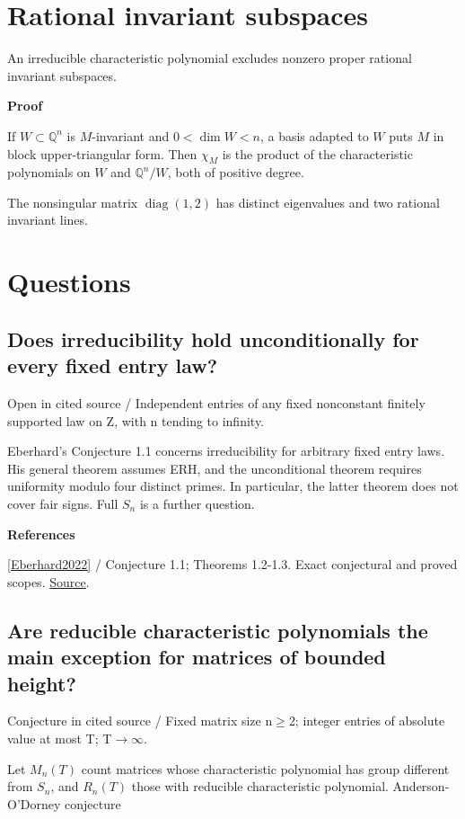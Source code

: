 \documentclass[11pt,a4paper,oneside,openany]{book}
\newenvironment{sources}{\par\smallskip\begingroup\footnotesize\color{atlasgray}\leftskip=10pt\setlength{\parskip}{2pt}}{\par\endgroup\smallskip}
\begin{document}
\section{Rational invariant subspaces}
\color{black} An irreducible characteristic polynomial excludes nonzero proper rational invariant subspaces.\par

\begin{atlasblock}[standard]
\textbf{\sffamily Proof}\par\smallskip
\color{black} If \(W\subset\mathbb Q^n\) is \(M\)-invariant and \(0<\dim W<n\), a basis adapted to \(W\) puts \(M\) in block upper-triangular form. Then \(\chi_M\) is the product of the characteristic polynomials on \(W\) and \(\mathbb Q^n/W\), both of positive degree.\par
\end{atlasblock}\color{black}
\color{black} The nonsingular matrix \(\operatorname{diag}(1,2)\) has distinct eigenvalues and two rational invariant lines.\par
{}\section*{Questions}
\subsection*{Does irreducibility hold unconditionally for every fixed entry law?}
{\small\sffamily\color{atlasgold}Open in cited source / Independent entries of any fixed nonconstant finitely supported law on Z, with n tending to infinity.}\par\smallskip
\color{black} Eberhard's Conjecture 1.1 concerns irreducibility for arbitrary fixed entry laws. His general theorem assumes ERH, and the unconditional theorem requires uniformity modulo four distinct primes. In particular, the latter theorem does not cover fair signs. Full \(S_n\) is a further question.\par
\begin{sources}
\textbf{References}\par\smallskip
\noindent\hyperlink{ref:Eberhard2022}{[Eberhard2022]} / Conjecture 1.1; Theorems 1.2-1.3. Exact conjectural and proved scopes. \href{https://arxiv.org/abs/2008.01223}{Source}.\par
\end{sources}\color{black}
\subsection*{Are reducible characteristic polynomials the main exception for matrices of bounded height?}
{\small\sffamily\color{atlasgold}Conjecture in cited source / Fixed matrix size n\ensuremath{\ge}2; integer entries of absolute value at most T; T\ensuremath{\to}\ensuremath{\infty}.}\par\smallskip
\color{black} Let \(M_n(T)\) count matrices whose characteristic polynomial has group different from \(S_n\), and \(R_n(T)\) those with reducible characteristic polynomial. Anderson-O'Dorney conjecture\par
\end{document}
